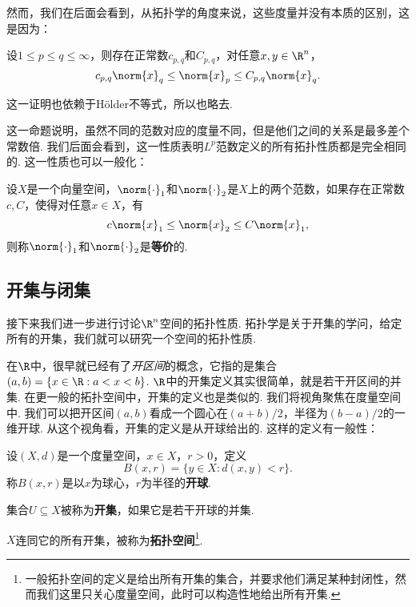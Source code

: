 然而，我们在后面会看到，从拓扑学的角度来说，这些度量并没有本质的区别，这是因为：

\begin{proposition}\label{prop:lp-metric}
    设$1\leq p\leq q\leq \infty$，则存在正常数$c_{p,q}$和$C_{p,q}$，对任意$x,y\in\R^n$，
    \[c_{p,q}\norm{x}_q\leq \norm{x}_p\leq C_{p,q}\norm{x}_q.\]
\end{proposition}

这一证明也依赖于H\"older不等式，所以也略去. 

这一命题说明，虽然不同的范数对应的度量不同，但是他们之间的关系是最多差个常数倍. 我们后面会看到，这一性质表明$L^p$范数定义的所有拓扑性质都是完全相同的. 这一性质也可以一般化：

\begin{definition}[等价范数]
    设$X$是一个向量空间，$\norm{\cdot}_1$和$\norm{\cdot}_2$是$X$上的两个范数，如果存在正常数$c,C$，使得对任意$x\in X$，有
    \[c\norm{x}_1\leq \norm{x}_2\leq C\norm{x}_1,\]
    则称$\norm{\cdot}_1$和$\norm{\cdot}_2$是\textbf{等价}的. 
\end{definition}

\subsection{开集与闭集}

接下来我们进一步进行讨论$\R^n$空间的拓扑性质. 拓扑学是关于开集的学问，给定所有的开集，我们就可以研究一个空间的拓扑性质. 

在$\R$中，很早就已经有了\emph{开区间}的概念，它指的是集合$(a,b)=\{x\in\R:a<x<b\}$. $\R$中的开集定义其实很简单，就是若干开区间的并集. 在更一般的拓扑空间中，开集的定义也是类似的. 我们将视角聚焦在度量空间中. 我们可以把开区间$(a,b)$看成一个圆心在$(a+b)/2$，半径为$(b-a)/2$的一维开球. 从这个视角看，开集的定义是从开球给出的. 这样的定义有一般性：

\begin{definition}[开球，开集，拓扑空间]
    设$(X,d)$是一个度量空间，$x\in X$，$r>0$，定义
    \[B(x,r)=\{y\in X:d(x,y)<r\}.\]
    称$B(x,r)$是以$x$为球心，$r$为半径的\textbf{开球}. 
    
    集合$U\subseteq X$被称为\textbf{开集}，如果它是若干开球的并集. 

    $X$连同它的所有开集，被称为\textbf{拓扑空间}\footnote{一般拓扑空间的定义是给出所有开集的集合，并要求他们满足某种封闭性，然而我们这里只关心度量空间，此时可以构造性地给出所有开集. }. 
\end{definition}

